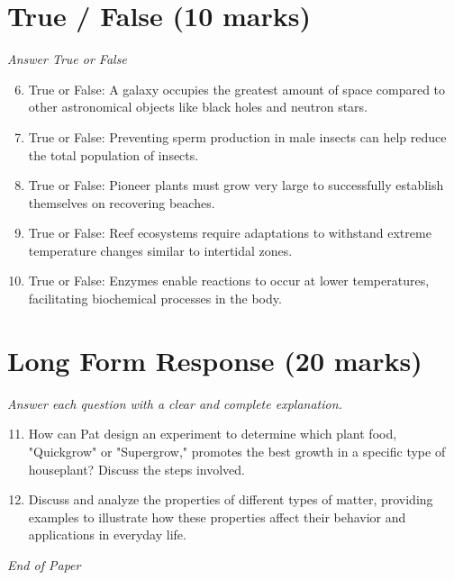 \documentclass[12pt]{article}
\begin{document}
\section*{True / False (10 marks)}
\textit{Answer True or False}
\begin{enumerate}[label=\arabic*.]
\setcounter{enumi}{5}
\item True or False: A galaxy occupies the greatest amount of space compared to other astronomical objects like black holes and neutron stars.
\item True or False: Preventing sperm production in male insects can help reduce the total population of insects.
\item True or False: Pioneer plants must grow very large to successfully establish themselves on recovering beaches.
\item True or False: Reef ecosystems require adaptations to withstand extreme temperature changes similar to intertidal zones.
\item True or False: Enzymes enable reactions to occur at lower temperatures, facilitating biochemical processes in the body.
\end{enumerate}

\section*{Long Form Response (20 marks)}
\textit{Answer each question with a clear and complete explanation.}
\begin{enumerate}[label=\arabic*.]
\setcounter{enumi}{10}
\item How can Pat design an experiment to determine which plant food, "Quickgrow" or "Supergrow," promotes the best growth in a specific type of houseplant? Discuss the steps involved.
\item Discuss and analyze the properties of different types of matter, providing examples to illustrate how these properties affect their behavior and applications in everyday life.
\end{enumerate}

\vfill
\noindent\textit{End of Paper}
\end{document}
